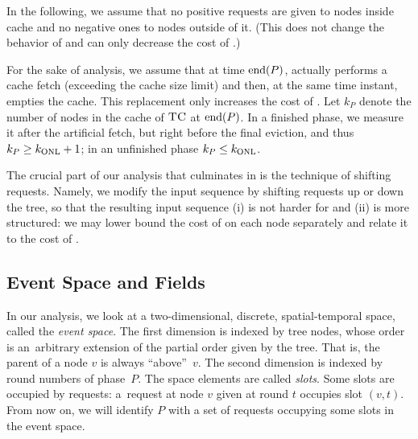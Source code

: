 In the following, we assume that no positive requests are given to nodes
inside cache and no negative ones to nodes outside of it. (This does not
change the behavior of \ALGTC and can only decrease the cost of \OPT.)

For the sake of analysis, we assume that at time $\textrm{end}(P)$, \ALGTC actually
performs a cache fetch (exceeding the cache size limit) and then, at the same
time instant, empties the cache. This replacement only increases the cost of
\ALGTC. Let $k_P$ denote the number of nodes in the cache of $\textsc{TC}$ at $\textrm{end}(P)$.
In a finished phase, we measure it after the artificial fetch, but right
before the final eviction, and thus $k_P \geq k_\textnormal{ONL} + 1$; in an unfinished
phase $k_P \leq k_\textnormal{ONL}$.

The crucial part of our analysis that culminates in
 is the technique of shifting requests. Namely, we
modify the input sequence by shifting requests up or down the tree, so that
the resulting input sequence (i) is not harder for \OPT and (ii) is more
structured: we may lower bound the cost of \OPT on each node separately and
relate it to the cost of \ALGTC.



\subsection{Event Space and Fields}
\label{sec:event}

In our analysis, we look at a two-dimensional, discrete, spatial-temporal
space, called the \emph{event space}. The first dimension is indexed by tree
nodes, whose order is an~arbitrary extension of the partial order given by the
tree. That is, the parent of a node $v$ is always ``above''~$v$. The second
dimension is indexed by round numbers of phase~$P$. The space elements are
called \emph{slots}. Some slots are occupied by requests: a~request at node
$v$ given at round $t$ occupies slot $(v,t)$. From now on, we will identify
$P$ with a set of requests occupying some slots in the event space.

